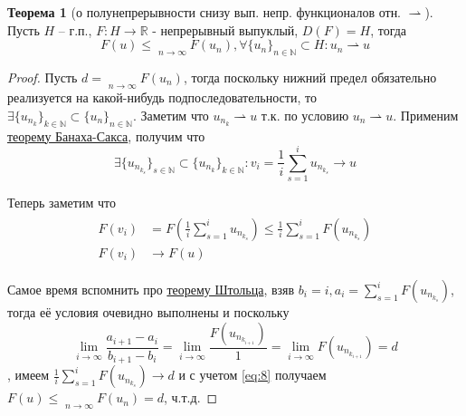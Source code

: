 \documentclass[12pt,a4paper]{article}
\theoremstyle{definition}
\newtheorem{theorem}{Теорема}
\newcommand{\Real}{\mathbb{R}}
\newcommand{\Natural}{\mathbb{N}}
\DeclareMathOperator*\lowlim{\underline{lim}}
\newcommand{\seq}[2]{\{#1\}_{#2}}
\newcommand{\weakto}{\rightharpoonup}
\begin{document}
\begin{theorem}[о полунепрерывности снизу вып. непр. функционалов отн. $\weakto$]
	Пусть $H$ -- г.п., $F: H \to \Real$ - непрерывный выпуклый, $D(F) = H$, тогда $$F(u) \leq \lowlim\limits_{n\to\infty}{F(u_n)}, \forall \seq{u_n}{n\in\Natural}\subset H: u_n \weakto u$$
\end{theorem}
\begin{proof}
	Пусть $d = \lowlim\limits_{n\to\infty}{F(u_n)}$, тогда поскольку нижний предел обязательно реализуется на какой-нибудь подпоследовательности, то \\ $\exists \seq{u_{n_k}}{k\in\Natural} \subset \seq{u_n}{n\in\Natural}$. Заметим что $u_{n_k} \weakto u$ т.к. по условию $u_n \weakto u$. Применим \hyperref[th:6]{теорему Банаха-Сакса}, получим что 
	$$\exists\seq{u_{n_{k_s}}}{s\in\Natural}\subset\seq{u_{n_k}}{k\in\Natural}: v_i = \frac{1}{i}\sum_{s=1}^{i}{u_{n_{k_s}}} \to u$$
	
	Теперь заметим что
	\begin{align}\label{eq:8}
		\begin{split}
		F(v_i) &= F\left(\frac{1}{i} \sum_{s=1}^{i}{u_{n_{k_s}}}\right) \leq \frac{1}{i}\sum\limits_{s=1}^{i}{F(u_{n_{k_s}})} \\
		F(v_i) &\to F(u)
		\end{split}
	\end{align}
	
	Самое время вспомнить про \hyperref[prop:1]{теорему Штольца}, взяв $b_i = i, a_i = \sum\limits_{s=1}^{i}{F(u_{n_{k_s}})}$, тогда
	её условия очевидно выполнены и поскольку
	$$\lim_{i\to\infty}{\frac{a_{i+1} - a_i}{b_{i+1} - b_i}}=
	\lim_{i\to\infty}{\frac{F(u_{n_{k_{i+1}}})}{1}} = \lim_{i\to\infty}{F(u_{n_{k_{i+1}}})} = d$$
	, имеем $\frac{1}{i}\sum\limits_{s=1}^{i}{F(u_{n_{k_s}})} \to d$ и с учетом \eqref{eq:8} получаем $F(u) \leq \lowlim\limits_{n\to\infty}{F(u_n)} = d$, ч.т.д.
\end{proof} 

\end{document}

